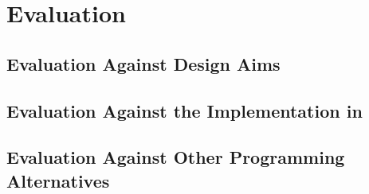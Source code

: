 \cleardoublepage
\chapter{Evaluation}
\label{ch:evaluation}

\section{Evaluation Against Design Aims}

\section{Evaluation Against the Implementation in \cite{sess_type_guided_distr_interact}}

\section{Evaluation Against Other Programming Alternatives}
